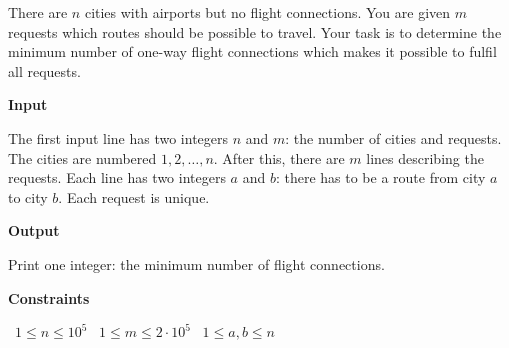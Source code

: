There are $n$ cities with airports but no flight connections. You are given $m$ requests which routes should be possible to travel.
Your task is to determine the minimum number of one-way flight connections which makes it possible to fulfil all requests.

\vspace{0.3cm}\noindent\textbf{Input}

The first input line has two integers $n$ and $m$: the number of cities and requests. The cities are numbered $1,2,\dots,n$.
After this, there are $m$ lines describing the requests. Each line has two integers $a$ and $b$: there has to be a route from city $a$ to city $b$. Each request is unique.

\vspace{0.3cm}\noindent\textbf{Output}

Print one integer: the minimum number of flight connections.

\vspace{0.3cm}\noindent\textbf{Constraints}

\textbullet\ $1 \le n \le 10^5$
\textbullet\ $1 \le m \le 2 \cdot 10^5$
\textbullet\ $1 \le a, b \le n$